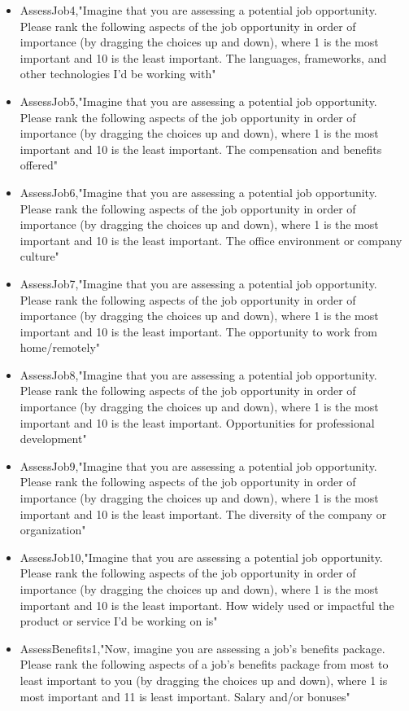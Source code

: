 \begin{appendices}
\begin{itemize}
        \item AssessJob4,"Imagine that you are assessing a potential job opportunity. Please rank the following aspects of the job opportunity in order of importance (by dragging the choices up and down), where 1 is the most important and 10 is the least important. The languages, frameworks, and other technologies I'd be working with"
        \item AssessJob5,"Imagine that you are assessing a potential job opportunity. Please rank the following aspects of the job opportunity in order of importance (by dragging the choices up and down), where 1 is the most important and 10 is the least important. The compensation and benefits offered"
        \item AssessJob6,"Imagine that you are assessing a potential job opportunity. Please rank the following aspects of the job opportunity in order of importance (by dragging the choices up and down), where 1 is the most important and 10 is the least important. The office environment or company culture"
        \item AssessJob7,"Imagine that you are assessing a potential job opportunity. Please rank the following aspects of the job opportunity in order of importance (by dragging the choices up and down), where 1 is the most important and 10 is the least important. The opportunity to work from home/remotely"
        \item AssessJob8,"Imagine that you are assessing a potential job opportunity. Please rank the following aspects of the job opportunity in order of importance (by dragging the choices up and down), where 1 is the most important and 10 is the least important. Opportunities for professional development"
        \item AssessJob9,"Imagine that you are assessing a potential job opportunity. Please rank the following aspects of the job opportunity in order of importance (by dragging the choices up and down), where 1 is the most important and 10 is the least important. The diversity of the company or organization"
        \item AssessJob10,"Imagine that you are assessing a potential job opportunity. Please rank the following aspects of the job opportunity in order of importance (by dragging the choices up and down), where 1 is the most important and 10 is the least important. How widely used or impactful the product or service I'd be working on is"
        \item AssessBenefits1,"Now, imagine you are assessing a job's benefits package. Please rank the following aspects of a job's benefits package from most to least important to you (by dragging the choices up and down), where 1 is most important and 11 is least important. Salary and/or bonuses"

\end{itemize}
\end{appendices}
